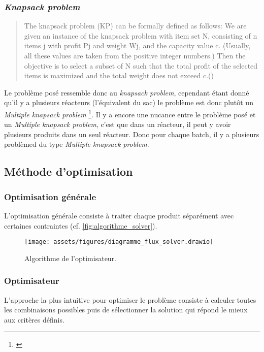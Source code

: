\subsubsection{\textit{Knapsack problem}}
\begin{quotation}
    \og The knapsack problem (KP) can be formally defined as follows: We are given an
    instance of the knapsack problem with item set N, consisting of n items j with profit
    Pj and weight Wj, and the capacity value c. (Usually, all these values are taken from
    the positive integer numbers.) Then the objective is to select a subset of N such
    that the total profit of the selected items is maximized and the total weight does not
    exceed c.\fg (\cite[p. 2]{KnapsackProblemsBook})
\end{quotation}
Le problème posé ressemble donc au \textit{knapsack problem}, cependant étant donné qu'il y a plusieurs réacteurs (l'équivalent du sac) le problème est donc plutôt un \textit{Multiple knapsack problem} \footnote{\parencite[p. 285]{KnapsackProblemsBook}}. Il y a encore une nucance entre le problème posé et un \textit{Multiple knapsack problem}, c'est que dans un réacteur, il peut y avoir plusieurs produits dans un seul réacteur. Donc pour chaque batch, il y a plusieurs problèmed du type \textit{Multiple knapsack problem}.
\subsection{Méthode d'optimisation}
\subsubsection{Optimisation générale}
L'optimisation générale consiste à traiter chaque produit séparément avec certaines contraintes (cf. \autoref{fig:algorithme_solver}).
\begin{figure}[H]
    \centering
    \texttt{[image: assets/figures/diagramme\_flux\_solver.drawio]}
    \caption{Algorithme de l'optimisateur.}
    \label{fig:algorithme_optimisateur}
\end{figure}

\subsubsection{Optimisateur}
L'approche la plus intuitive pour optimiser le problème consiste à calculer toutes les combinaisons possibles puis de sélectionner la solution qui répond le mieux aux critères définis.

